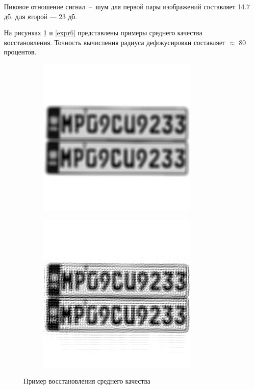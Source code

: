 Пиковое отношение сигнал~--~шум для первой пары изображений составляет 14.7 дб, для второй --- 23 дб.

На рисунках \ref{expr5} и \ref{expr6} представлены примеры среднего качества восстановления. Точность вычисления радиуса дефокусировки составляет $\approx$ 80 процентов.

\begin{figure}[!h]
	\centering
	\begin{subfigure}{.5\textwidth}
		\centering
		\includegraphics[scale=0.65]{assets/car_r5}
	\end{subfigure}%
	\begin{subfigure}{.5\textwidth}
		\centering
		\includegraphics[scale=0.85]{assets/car_r5_result}
	\end{subfigure}
	\caption{Пример восстановления среднего качества}
	\label{expr5}
\end{figure}

